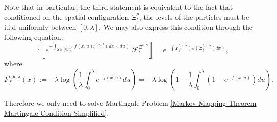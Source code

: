 \documentclass[12pt]{article}
\begin{document}
Note that in particular, the third statement is equivalent to the fact that conditioned on the spatial configuration $\Xi^{\theta}_t$, the levels of the particles must be i.i.d uniformly between $[0,\lambda]$. We may also express this condition through the following equation:
\begin{equation}\label{Markov Mapping Theorem Cox Condition}
\mathbb{E}\left[e^{-\int_{S \times [0,\lambda]} f(x,u) \xi^{\epsilon,\theta,\lambda}(dx \times du)}\bigg| \mathcal{F}^{\Xi^{\epsilon,N}}_t\right]=e^{-\int F^{\epsilon,\theta,\lambda}_f(x) \Xi^{\epsilon,\theta,\lambda}_t(dx)},
\end{equation}
where 
$$F^{\epsilon,\theta,\lambda}_f(x):=-\lambda\log \left(\frac{1}{\lambda}\int_{0}^{\lambda}e^{-f(x,u)}du\right)=-\lambda\log \left(1-\frac{1}{\lambda}\int_{0}^{\lambda}(1-e^{-f(x,u)})du\right).$$

Therefore we only need to solve Martingale Problem \eqref{Markov Mapping Theorem Martingale Condition Simplified}.\\
\end{document}
